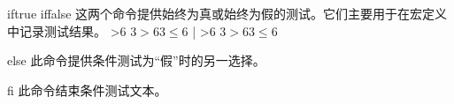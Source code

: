 \begindesc
\ctspecial iftrue {}
\ctspecial iffalse {}
\explain
这两个命令提供始终为真或始终为假的测试。它们主要用于在宏定义中记录测试结果。
\example
\def\isbigger{\let\bigger=\iftrue}
\def\isnotbigger{\let\bigger=\iffalse}
\def\test#1#2{\ifnum #1>#2 \isbigger\else\isnotbigger\fi}
\test{3}{6}
\bigger$3>6$\else$3\le6$\fi
|
\produces
\def\isbigger{\let\bigger=\iftrue}
\def\isnotbigger{\let\bigger=\iffalse}
\def\test#1#2{\ifnum #1>#2 \isbigger\else\isnotbigger\fi}
\test{3}{6}
\bigger$3>6$\else$3\le6$\fi
\endexample
\enddesc

\begindesc
\ctspecial else {} 
\explain
此命令提供条件测试为``假''时的另一选择。
\enddesc

\begindesc
\ctspecial fi {} 
\explain
此命令结束条件测试文本。
\enddesc

